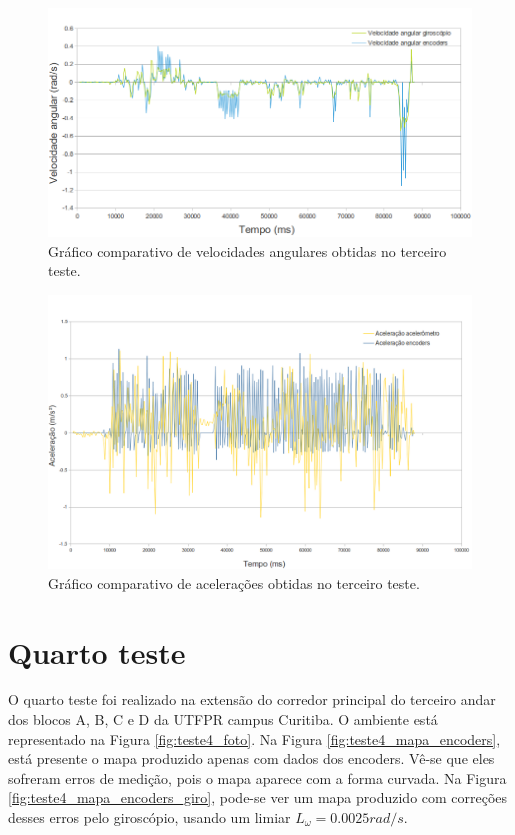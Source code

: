\begin{figure}[H]
	\centering
	\includegraphics[width=1\textwidth]{./figuras/testes/teste3/grafico_giro.png}
	\caption{Gráfico comparativo de velocidades angulares obtidas no terceiro teste.}
	\label{fig:teste3_giro_grafico}
\end{figure}

\begin{figure}[H]
	\centering
	\includegraphics[width=1\textwidth]{./figuras/testes/teste3/grafico_acel.png}
	\caption{Gráfico comparativo de acelerações obtidas no terceiro teste.}
	\label{fig:teste3_acel_grafico}
\end{figure}

\section{Quarto teste}

O quarto teste foi realizado na extensão do corredor principal do terceiro andar dos blocos A, B, C e D da UTFPR campus Curitiba. O ambiente está representado na Figura \ref{fig:teste4_foto}. Na Figura \ref{fig:teste4_mapa_encoders}, está presente o mapa produzido apenas com dados dos encoders. Vê-se que eles sofreram erros de medição, pois o mapa aparece com a forma curvada. Na Figura \ref{fig:teste4_mapa_encoders_giro}, pode-se ver um mapa produzido com correções desses erros pelo giroscópio, usando um limiar $L_\omega = 0.0025 \unit{rad/s}$.

